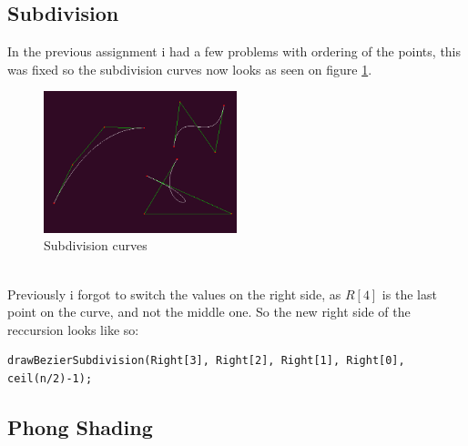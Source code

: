 \documentclass{article}
\begin{document}
\subsection{Subdivision}
In the previous assignment i had a few problems with ordering of the points,
this was fixed so the subdivision curves now looks as seen on figure \ref{fig:curves}.
\begin{figure}[h!]
\centering
    \includegraphics[width=0.5\textwidth, keepaspectratio]{curves.png}
    \caption{Subdivision curves}
    \label{fig:curves}
\end{figure}\\
Previously i forgot to switch the values on the right side, as $R[4]$ is the last point
on the curve, and not the middle one. So the new right side of the reccursion looks like so:
\begin{verbatim}
drawBezierSubdivision(Right[3], Right[2], Right[1], Right[0], ceil(n/2)-1);
\end{verbatim}
\subsection{Phong Shading}
\end{document}
